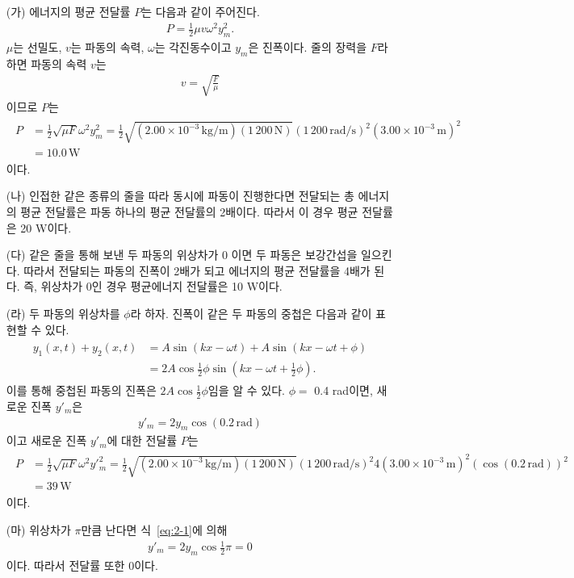\documentclass[floatfix,nofootinbib,superscriptaddress,fleqn]{revtex4-2}
\begin{document}
\begin{itemize}
  \item[(가)]
  에너지의 평균 전달률 $P$는 다음과 같이 주어진다.
  \begin{align}
    P = \frac{1}{2}\mu v \omega^2y_m^2.
  \end{align}
  $\mu$는 선밀도, $v$는 파동의 속력, $\omega$는 각진동수이고 $y_m$은 진폭이다.
  줄의 장력을 $F$라 하면 파동의 속력 $v$는
  \begin{align}
    v = \sqrt{\frac{F}{\mu}}
  \end{align}
  이므로 $P$는
  \begin{align}
    \begin{split}
      P &= \frac{1}{2}\sqrt{\mu F}\omega^2y^2_m
      = \frac{1}{2}\sqrt{(2.00\times 10^{-3}\,\mathrm{kg/m})(1\,200\,\mathrm{N})}
      (1\,200\,\mathrm{rad/s})^2(3.00\times10^{-3}\,\mathrm{m})^2 \\
      &=10.0\,\mathrm{W}
    \end{split}
  \end{align}
  이다.
  \item[(나)]
  인접한 같은 종류의 줄을 따라 동시에 파동이 진행한다면 전달되는 총 에너지의 평균 전달률은 파동 하나의 평균
  전달률의 2배이다. 따라서 이 경우 평균 전달률은 20 W이다.
  \item[(다)]
  같은 줄을 통해 보낸 두 파동의 위상차가 0 이면 두 파동은 보강간섭을 일으킨다. 따라서 전달되는 파동의 진폭이 2배가 되고
  에너지의 평균 전달률을 4배가 된다. 즉, 위상차가 0인 경우 평균에너지 전달률은 10 W이다.
  \item[(라)]
  두 파동의 위상차를 $\phi$라 하자. 진폭이 같은 두 파동의 중첩은 다음과 같이 표현할 수 있다.
  \begin{align}\label{eq:2-1}
    \begin{split}
      y_1(x,t)+y_2(x,t) &= A\sin{(kx-\omega t)}+A\sin{(kx-\omega t+\phi)}  \\
      &=2A\cos{\frac{1}{2}\phi}\sin{\left(kx-\omega t+\frac{1}{2}\phi\right)}.
    \end{split}
  \end{align}
  이를 통해 중첩된 파동의 진폭은 $2A\cos{\frac{1}{2}\phi}$임을 알 수 있다. $\phi = $ 0.4 rad이면,
  새로운 진폭 $y'_m$은
  \begin{align}
    y'_m = 2y_m\cos(0.2\,\mathrm{rad})
  \end{align}
  이고 새로운 진폭 $y'_m$에 대한 전달률 $P$는
  \begin{align}
    \begin{split}
      P &= \frac{1}{2}\sqrt{\mu F}\omega^2y'^2_m
      = \frac{1}{2}\sqrt{(2.00\times 10^{-3}\,\mathrm{kg/m})(1\,200\,\mathrm{N})}
      (1\,200\,\mathrm{rad/s})^2
      4(3.00\times10^{-3}\,\mathrm{m})^2
      (\cos(0.2\,\mathrm{rad}))^2 \\
      &=39\,\mathrm{W}
    \end{split}
  \end{align}
이다.

  \item[(마)]
  위상차가 $\pi$만큼 난다면 식~\eqref{eq:2-1}에 의해
  \begin{align}
    y'_m = 2y_m\cos\frac{1}{2}\pi = 0
  \end{align}
  이다. 따라서 전달률 또한 0이다.
\end{itemize}
\end{document}
